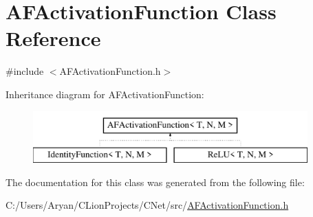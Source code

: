 \hypertarget{class_a_f_activation_function}{}\section{A\+F\+Activation\+Function Class Reference}
\label{class_a_f_activation_function}


{\ttfamily \#include $<$A\+F\+Activation\+Function.\+h$>$}

Inheritance diagram for A\+F\+Activation\+Function\+:\begin{figure}[H]
\begin{center}
\leavevmode
\includegraphics[height=2.000000cm]{class_a_f_activation_function}
\end{center}
\end{figure}


The documentation for this class was generated from the following file\+:\begin{DoxyCompactItemize}
\item 
C\+:/\+Users/\+Aryan/\+C\+Lion\+Projects/\+C\+Net/src/\hyperlink{_a_f_activation_function_8h}{A\+F\+Activation\+Function.\+h}\end{DoxyCompactItemize}
